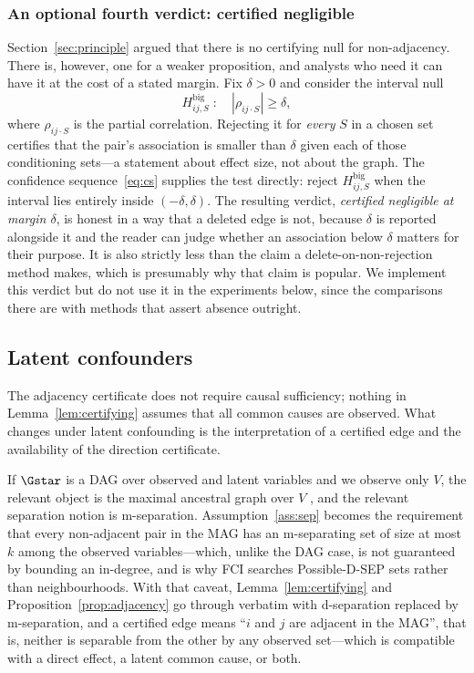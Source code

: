 \subsubsection{An optional fourth verdict: certified negligible}
\label{sec:negligible}

Section~\ref{sec:principle} argued that there is no certifying null for
non-adjacency. There is, however, one for a weaker proposition, and analysts
who need it can have it at the cost of a stated margin. Fix $\delta > 0$ and
consider the interval null
\begin{equation}\label{eq:ropenull}
H^{\mathrm{big}}_{ij,S} \;:\quad |\rho_{ij \cdot S}| \ge \delta ,
\end{equation}
where $\rho_{ij\cdot S}$ is the partial correlation. Rejecting it for
\emph{every} $S$ in a chosen set certifies that the pair's association is
smaller than $\delta$ given each of those conditioning sets---a statement
about effect size, not about the graph. The confidence
sequence~\eqref{eq:cs} supplies the test directly: reject $H^{\mathrm{big}}_{ij,S}$
when the interval lies entirely inside $(-\delta, \delta)$. The resulting verdict, \emph{certified
negligible at margin $\delta$}, is honest in a way that a deleted edge is not,
because $\delta$ is reported alongside it and the reader can judge whether an
association below $\delta$ matters for their purpose. It is also strictly less
than the claim a delete-on-non-rejection method makes, which is presumably why
that claim is popular. We implement this verdict but do not use it in the
experiments below, since the comparisons there are with methods that assert
absence outright.

\subsection{Latent confounders}\label{sec:latent}

The adjacency certificate does not require causal sufficiency; nothing in
Lemma~\ref{lem:certifying} assumes that all common causes are observed.
What changes under latent confounding is the interpretation of a certified
edge and the availability of the direction certificate.

If $\Gstar$ is a DAG over observed and latent variables and we observe only
$V$, the relevant object is the maximal ancestral graph over $V$
\citep{richardson2002ancestral}, and the relevant separation notion is
m-separation. Assumption~\ref{ass:sep} becomes the requirement that every
non-adjacent pair in the MAG has an m-separating set of size at most $k$ among
the observed variables---which, unlike the DAG case, is not guaranteed by
bounding an in-degree, and is why FCI searches Possible-D-SEP sets rather than
neighbourhoods. With that caveat, Lemma~\ref{lem:certifying} and
Proposition~\ref{prop:adjacency} go through verbatim with d-separation
replaced by m-separation, and a certified edge means ``$i$ and $j$ are
adjacent in the MAG'', that is, neither is separable from the other by any
observed set---which is compatible with a direct effect, a latent common
cause, or both.

